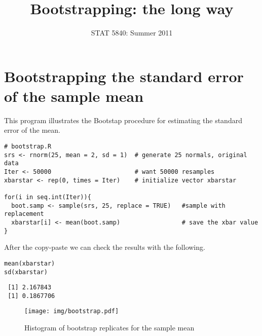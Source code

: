 \documentclass[11pt,english]{article}
\title{Bootstrapping: the long way}
\date{STAT 5840: Summer 2011}
\begin{document}
\maketitle

\thispagestyle{empty}

\section*{Bootstrapping the standard error of the sample mean}
\label{sec-1}

This program illustrates the Bootstap procedure for estimating the standard error of the mean.


\begin{verbatim}
# bootstrap.R
srs <- rnorm(25, mean = 2, sd = 1)  # generate 25 normals, original data 
Iter <- 50000                       # want 50000 resamples
xbarstar <- rep(0, times = Iter)    # initialize vector xbarstar

for(i in seq.int(Iter)){
  boot.samp <- sample(srs, 25, replace = TRUE)   #sample with replacement
  xbarstar[i] <- mean(boot.samp)                 # save the xbar value
}
\end{verbatim}

After the copy-paste we can check the results with the following.
\begin{verbatim}
mean(xbarstar)
sd(xbarstar)
\end{verbatim}

\begin{verbatim}
 [1] 2.167843
 [1] 0.1867706
\end{verbatim}



\begin{figure}[h!]
\centering
\texttt{[image: img/bootstrap.pdf]}
\caption{\label{fig:yplot}Histogram of bootstrap replicates for the sample mean}
\end{figure}
\end{document}
